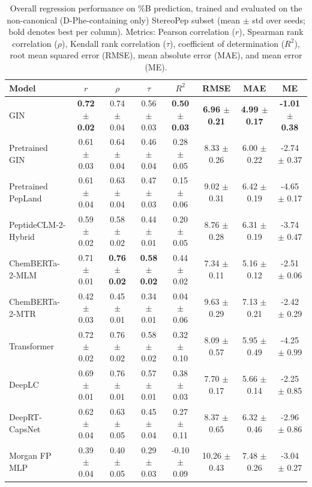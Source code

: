 \begin{table}[htbp]
  \caption{Overall regression performance on \%B prediction, trained and evaluated on the non-canonical (D-Phe-containing only) StereoPep subset (mean $\pm$ std over seeds; bold denotes best per column). Metrics: Pearson correlation ($r$), Spearman rank correlation ($\rho$), Kendall rank correlation ($\tau$), coefficient of determination ($R^2$), root mean squared error (RMSE), mean absolute error (MAE), and mean error (ME).}
  \label{tab:overall_performance_noncanonical}
  \centering
  \scriptsize
  \setlength{\tabcolsep}{6pt}
  \begin{tabular}{lccccccc}
    \toprule
    \textbf{Model} & \textbf{$r$} & \textbf{$\rho$} & \textbf{$\tau$} & \textbf{$R^2$} & \textbf{RMSE} & \textbf{MAE} & \textbf{ME} \\
    \midrule
    GIN & \textbf{0.72 $\pm$ 0.02} & 0.74 $\pm$ 0.04 & 0.56 $\pm$ 0.03 & \textbf{0.50 $\pm$ 0.03} & \textbf{6.96 $\pm$ 0.21} & \textbf{4.99 $\pm$ 0.17} & \textbf{-1.01 $\pm$ 0.38} \\
    Pretrained GIN & 0.61 $\pm$ 0.03 & 0.64 $\pm$ 0.04 & 0.46 $\pm$ 0.04 & 0.28 $\pm$ 0.05 & 8.33 $\pm$ 0.26 & 6.00 $\pm$ 0.22 & -2.74 $\pm$ 0.37 \\
    Pretrained PepLand & 0.61 $\pm$ 0.04 & 0.63 $\pm$ 0.04 & 0.47 $\pm$ 0.03 & 0.15 $\pm$ 0.06 & 9.02 $\pm$ 0.31 & 6.42 $\pm$ 0.19 & -4.65 $\pm$ 0.17 \\
    PeptideCLM-2-Hybrid & 0.59 $\pm$ 0.02 & 0.58 $\pm$ 0.02 & 0.44 $\pm$ 0.01 & 0.20 $\pm$ 0.05 & 8.76 $\pm$ 0.28 & 6.31 $\pm$ 0.19 & -3.74 $\pm$ 0.47 \\
    ChemBERTa-2-MLM & 0.71 $\pm$ 0.01 & \textbf{0.76 $\pm$ 0.02} & \textbf{0.58 $\pm$ 0.02} & 0.44 $\pm$ 0.02 & 7.34 $\pm$ 0.11 & 5.16 $\pm$ 0.12 & -2.51 $\pm$ 0.06 \\
    ChemBERTa-2-MTR & 0.42 $\pm$ 0.03 & 0.45 $\pm$ 0.01 & 0.34 $\pm$ 0.01 & 0.04 $\pm$ 0.06 & 9.63 $\pm$ 0.29 & 7.13 $\pm$ 0.21 & -2.42 $\pm$ 0.29 \\
    Transformer & 0.72 $\pm$ 0.02 & 0.76 $\pm$ 0.02 & 0.58 $\pm$ 0.02 & 0.32 $\pm$ 0.10 & 8.09 $\pm$ 0.57 & 5.95 $\pm$ 0.49 & -4.25 $\pm$ 0.99 \\
    DeepLC & 0.69 $\pm$ 0.01 & 0.76 $\pm$ 0.01 & 0.57 $\pm$ 0.01 & 0.38 $\pm$ 0.03 & 7.70 $\pm$ 0.17 & 5.66 $\pm$ 0.14 & -2.25 $\pm$ 0.85 \\
    DeepRT-CapsNet & 0.62 $\pm$ 0.04 & 0.63 $\pm$ 0.05 & 0.45 $\pm$ 0.04 & 0.27 $\pm$ 0.11 & 8.37 $\pm$ 0.65 & 6.32 $\pm$ 0.46 & -2.96 $\pm$ 0.86 \\
    Morgan FP MLP & 0.39 $\pm$ 0.04 & 0.40 $\pm$ 0.05 & 0.29 $\pm$ 0.03 & -0.10 $\pm$ 0.09 & 10.26 $\pm$ 0.43 & 7.48 $\pm$ 0.26 & -3.04 $\pm$ 0.27 \\
    \bottomrule
  \end{tabular}
\end{table}
